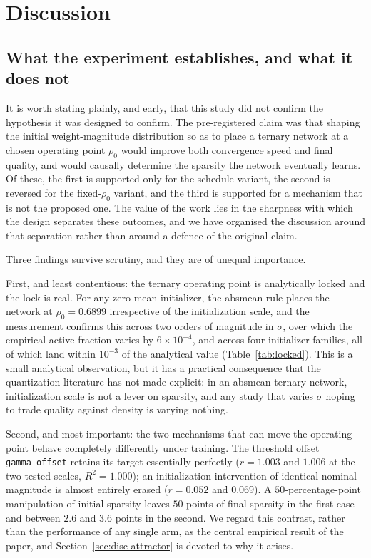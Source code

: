 \documentclass[final,5p,times,twocolumn]{elsarticle}
\theoremstyle{remark}
\newcommand{\rhoz}{\rho_{0}}
\begin{document}

\section{Discussion}
\label{sec:discussion}

\subsection{What the experiment establishes, and what it does not}
\label{sec:disc-summary}

It is worth stating plainly, and early, that this study did not confirm the
hypothesis it was designed to confirm. The pre-registered claim was that
shaping the initial weight-magnitude distribution so as to place a ternary
network at a chosen operating point $\rhoz$ would improve both convergence
speed and final quality, and would causally determine the sparsity the network
eventually learns. Of these, the first is supported only for the schedule
variant, the second is reversed for the fixed-$\rhoz$ variant, and the third is
supported for a mechanism that is not the proposed one. The value of the work
lies in the sharpness with which the design separates these outcomes, and we
have organised the discussion around that separation rather than around a
defence of the original claim.

Three findings survive scrutiny, and they are of unequal importance.

First, and least contentious: the ternary operating point is analytically
locked and the lock is real. For any zero-mean initializer, the absmean rule
places the network at $\rhoz = 0.6899$ irrespective of the initialization
scale, and the measurement confirms this across two orders of magnitude in
$\sigma$, over which the empirical active fraction varies by $6\times10^{-4}$,
and across four initializer families, all of which land within $10^{-3}$ of
the analytical value (Table~\ref{tab:locked}). This is a small analytical observation, but it has a
practical consequence that the quantization literature has not made explicit:
in an absmean ternary network, initialization scale is not a lever on sparsity,
and any study that varies $\sigma$ hoping to trade quality against density is
varying nothing.

Second, and most important: the two mechanisms that can move the
operating point behave completely differently under training. The threshold
offset \texttt{gamma\_offset} retains its target essentially perfectly ($r = 1.003$ and $1.006$ at the two
tested scales, $R^{2} = 1.000$); an initialization intervention of identical
nominal magnitude is almost entirely erased ($r = 0.052$ and $0.069$). A
$50$-percentage-point manipulation of initial sparsity leaves $50$ points of
final sparsity in the first case and between $2.6$ and $3.6$ points in the
second. We regard this contrast, rather than the performance of any single
arm, as the central empirical result of the paper, and Section~\ref{sec:disc-attractor} is devoted to why it arises.
\end{document}
